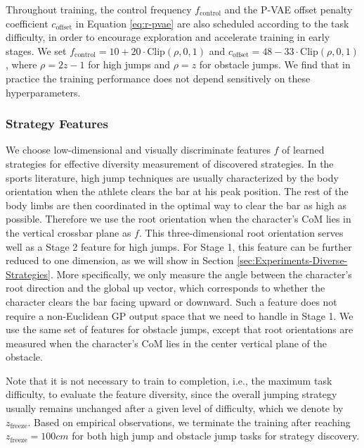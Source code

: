 Throughout training, the control frequency $f_\text{control}$ and the P-VAE offset penalty coefficient $c_\text{offset}$ in Equation \ref{eq:r-pvae} are also scheduled according to the task difficulty, in order to encourage exploration and accelerate training in early stages. We set $f_\text{control} = 10 + 20 \cdot \text{Clip}(\rho, 0, 1)$ and $c_\text{offset} = 48 - 33 \cdot \text{Clip}(\rho, 0, 1)$, where $\rho = 2z-1$ for high jumps and $\rho = z$ for obstacle jumps. We find that in practice the training performance does not depend sensitively on these hyperparameters.



\subsubsection{Strategy Features}
\label{sec:Experiments-Strategy-Features}
We choose low-dimensional and visually discriminate features $f$ of learned strategies for effective diversity measurement of discovered strategies. In the sports literature, high jump techniques are usually characterized by the body orientation when the athlete clears the bar at his peak position. The rest of the body limbs are then coordinated in the optimal way to clear the bar as high as possible. Therefore we use the root orientation when the character's CoM lies in the vertical crossbar plane as $f$. This three-dimensional root orientation serves well as a Stage 2 feature for high jumps. For Stage 1, this feature can be further reduced to one dimension, as we will show in Section \ref{sec:Experiments-Diverse-Strategies}. More specifically, we only measure the angle between the character's root direction and the global up vector, which corresponds to whether the character clears the bar facing upward or downward. Such a feature does not require a non-Euclidean GP output space that we need to handle in Stage 1. We use the same set of features for obstacle jumps, except that root orientations are measured when the character's CoM lies in the center vertical plane of the obstacle.

Note that it is not necessary to train to completion, i.e., the maximum task difficulty, to evaluate the feature diversity, since the overall jumping strategy usually remains unchanged after a given level of difficulty, which we denote by $z_\text{freeze}$. Based on empirical observations, we terminate the training after reaching $z_\text{freeze}=100cm$ for both high jump and obstacle jump tasks for strategy discovery. 

